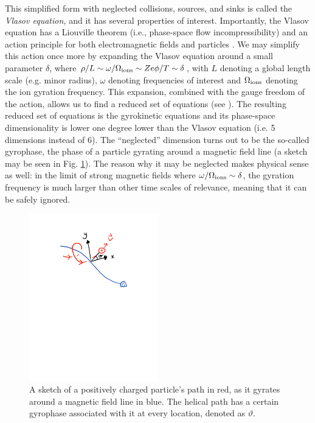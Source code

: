 This simplified form with neglected collisions, sources, and sinks is called the \textit{Vlasov equation,} and it has several properties of interest. Importantly, the Vlasov equation has a Liouville theorem (i.e., phase-space flow incompressibility) and an action principle for both electromagnetic fields and particles \cite{landau2013classical}. We may simplify this action once more by expanding the Vlasov equation around a small parameter $\delta$, where $\rho/L\sim \omega/\Omega_{\rm ions} \sim Ze \phi / T \sim \delta $, with $L$ denoting a global length scale (e.g. minor radius), $\omega$ denoting frequencies of interest and $\Omega_{\rm ions}$ denoting the ion gyration frequency. This expansion, combined with the gauge freedom of the action, allows us to find a reduced set of equations (see \citet{scott2017gyrokinetic}). The resulting reduced set of equations is the gyrokinetic equations and its phase-space dimensionality is lower one degree lower than the Vlasov equation (i.e. 5 dimensions instead of 6). The ``neglected'' dimension turns out to be the so-called gyrophase, the phase of a particle gyrating around a magnetic field line (a sketch may be seen in Fig. \ref{fig: gyrophase sketch}). The reason why it may be neglected makes physical sense as well: in the limit of strong magnetic fields where $\omega/\Omega_{\rm ions} \sim \delta$, the gyration frequency is much larger than other time scales of relevance, meaning that it can be safely ignored. \par
\begin{figure}
    \centering
    \includegraphics[width=0.5\textwidth]{3_chapters/0_introduction/img/gyrophase-sketch.pdf}
    \caption{A sketch of a positively charged particle's path in red, as it gyrates around a magnetic field line in blue. The helical path has a certain gyrophase associated with it at every location, denoted as $\vartheta$.}
    \label{fig: gyrophase sketch}
\end{figure}

